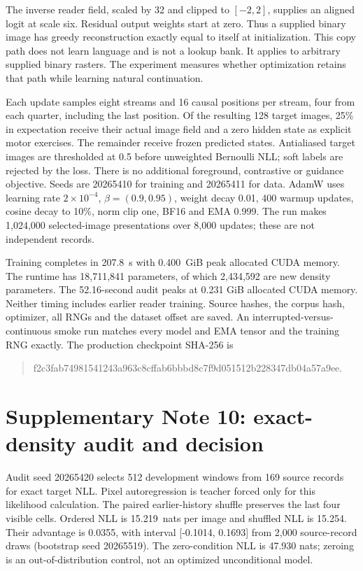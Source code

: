 \documentclass[10pt,a4paper]{article}
\newcommand{\DensitySeconds}{207.8}
\newcommand{\DensityMemory}{0.400}
\newcommand{\DensityNll}{15.219}
\newcommand{\DensityShuffledNll}{15.254}
\newcommand{\DensityAdvantage}{0.0355}
\newcommand{\DensityLow}{-0.1014}
\newcommand{\DensityHigh}{0.1693}
\begin{document}
The inverse reader field, scaled by 32 and clipped to $[-2,2]$, supplies an
aligned logit at scale six. Residual output weights start at zero. Thus a
supplied binary image has greedy reconstruction exactly equal to itself at
initialization. This copy path does not learn language and is not a lookup
bank. It applies to arbitrary supplied binary rasters. The experiment measures
whether optimization retains that path while learning natural continuation.

Each update samples eight streams and 16 causal positions per stream, four
from each quarter, including the last position. Of the resulting 128 target
images, 25\% in expectation receive their actual image field and a zero hidden
state as explicit motor exercises. The remainder receive frozen predicted
states. Antialiased target images are thresholded at 0.5 before unweighted
Bernoulli NLL; soft labels are rejected by the loss. There is no additional
foreground, contrastive or guidance objective. Seeds are 20265410 for training
and 20265411 for data. AdamW uses learning rate $2\times10^{-4}$,
$\beta=(0.9,0.95)$, weight decay 0.01, 400 warmup updates, cosine decay to
10\%, norm clip one, BF16 and EMA 0.999. The run makes 1,024,000 selected-image
presentations over 8,000 updates; these are not independent records.

Training completes in \DensitySeconds\ s with \DensityMemory\ GiB peak allocated
CUDA memory. The runtime has 18,711,841 parameters, of which 2,434,592 are
new density parameters. The 52.16-second audit peaks at 0.231 GiB allocated
CUDA memory. Neither timing includes earlier reader training. Source hashes,
the corpus hash, optimizer, all RNGs and the dataset offset are saved. An
interrupted-versus-continuous smoke run matches every model and EMA tensor and
the training RNG exactly. The production checkpoint SHA-256 is
\begin{quote}\small\ttfamily
f2c3fab74981541243a963c8cffab6bbbd8c7f9d051512b228347db04a57a9ee.
\end{quote}

\section*{Supplementary Note 10: exact-density audit and decision}
Audit seed 20265420 selects 512 development windows from 169 source records
for exact target NLL. Pixel autoregression is teacher forced only for this
likelihood calculation. The paired earlier-history shuffle preserves the last
four visible cells. Ordered NLL is \DensityNll\ nats per image and shuffled
NLL is \DensityShuffledNll. Their advantage is \DensityAdvantage, with interval
[\DensityLow, \DensityHigh] from 2,000 source-record draws (bootstrap seed
20265519). The zero-condition NLL is 47.930 nats; zeroing is an
out-of-distribution control, not an optimized unconditional model.
\end{document}
